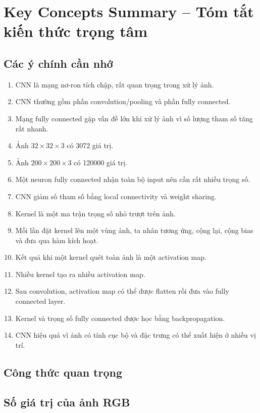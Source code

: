 \section{Key Concepts Summary -- Tóm tắt kiến thức trọng tâm}

\subsection{Các ý chính cần nhớ}

\begin{enumerate}
    \item CNN là mạng nơ-ron tích chập, rất quan trọng trong xử lý ảnh.
    \item CNN thường gồm phần convolution/pooling và phần fully connected.
    \item Mạng fully connected gặp vấn đề lớn khi xử lý ảnh vì số lượng tham số tăng rất nhanh.
    \item Ảnh $32\times32\times3$ có 3072 giá trị.
    \item Ảnh $200\times200\times3$ có 120000 giá trị.
    \item Một neuron fully connected nhận toàn bộ input nên cần rất nhiều trọng số.
    \item CNN giảm số tham số bằng local connectivity và weight sharing.
    \item Kernel là một ma trận trọng số nhỏ trượt trên ảnh.
    \item Mỗi lần đặt kernel lên một vùng ảnh, ta nhân tương ứng, cộng lại, cộng bias và đưa qua hàm kích hoạt.
    \item Kết quả khi một kernel quét toàn ảnh là một activation map.
    \item Nhiều kernel tạo ra nhiều activation map.
    \item Sau convolution, activation map có thể được flatten rồi đưa vào fully connected layer.
    \item Kernel và trọng số fully connected được học bằng backpropagation.
    \item CNN hiệu quả vì ảnh có tính cục bộ và đặc trưng có thể xuất hiện ở nhiều vị trí.
\end{enumerate}

\subsection{Công thức quan trọng}

\subsection*{Số giá trị của ảnh RGB}

